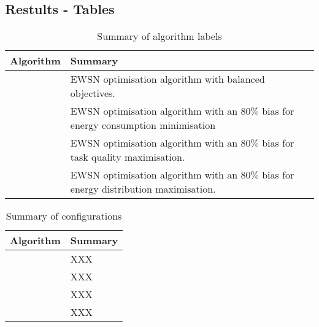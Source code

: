\subsection{Restults - Tables}

\begin{table}[h]
	\begin{tabular}
		{|p{}|p{}|}
		\hline
		\textbf{Algorithm} & \textbf{Summary}\\
		\hline
		\algorithmBalanced{}{} &  EWSN optimisation algorithm with balanced objectives. \\
		\algorithmEnergy{}{} & EWSN optimisation algorithm with an $80\%$ bias for energy consumption minimisation \\
		\algorithmQuality{}{} & EWSN optimisation algorithm with an $80\%$ bias for task quality maximisation. \\
		\algorithmDistribution{}{} & EWSN optimisation algorithm with an $80\%$ bias for energy distribution maximisation. \\
		\hline
	\end{tabular}
	\captionsetup{labelfont=bf,singlelinecheck=on}
\caption{Summary of algorithm labels}
\label{table:summary_of_algorithms}
\end{table}

\begin{table}[h]
	\begin{tabular}
		{|p{}|p{}|}
		\hline
		\textbf{Algorithm} & \textbf{Summary}\\
		\hline
		\algorithmBalanced{}{} & XXX  \\
		\algorithmEnergy{}{} & XXX \\
		\algorithmQuality{}{} & XXX \\
		\algorithmDistribution{}{} &  XXX \\
		\hline
	\end{tabular}
	\captionsetup{labelfont=bf,singlelinecheck=on}
	\caption{Summary of configurations}
	\label{table:summary_of_configurations}
\end{table}

